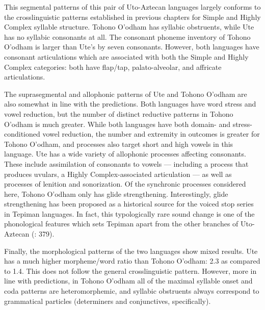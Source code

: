   This segmental patterns of this pair of Uto-Aztecan languages largely conforms to the crosslinguistic patterns established in previous chapters for Simple and Highly Complex syllable structure. Tohono O’odham has syllabic obstruents, while Ute has no syllabic consonants at all. The consonant phoneme inventory of Tohono O’odham is larger than Ute’s by seven consonants. However, both languages have consonant articulations which are associated with both the Simple and Highly Complex categories: both have flap/tap, palato-alveolar, and affricate articulations.

  The suprasegmental and allophonic patterns of Ute and Tohono O’odham are also somewhat in line with the predictions. Both languages have word stress and vowel reduction, but the number of distinct reductive patterns in Tohono O’odham is much greater. While both languages have both domain- and stress-conditioned vowel reduction, the number and extremity in outcomes is greater for Tohono O’odham, and processes also target short and high vowels in this language. Ute has a wide variety of allophonic processes affecting consonants. These include assimilation of consonants to vowels — including a process that produces uvulars, a Highly Complex-associated articulation — as well as processes of lenition and sonorization. Of the synchronic processes considered here, Tohono O’odham only has glide strengthening. Interestingly, glide strengthening has been proposed as a historical source for the voiced stop series in Tepiman languages. In fact, this typologically rare sound change is one of the phonological features which sets Tepiman apart from the other branches of Uto-Aztecan (\citealt{ShaulHill1998}: 379).

  Finally, the morphological patterns of the two languages show mixed results. Ute has a much higher morpheme/word ratio than Tohono O’odham: 2.3 as compared to 1.4. This does not follow the general crosslinguistic pattern. However, more in line with predictions, in Tohono O’odham all of the maximal syllable onset and coda patterns are heteromorphemic, and syllabic obstruents always correspond to grammatical particles (determiners and conjunctives, specifically).

